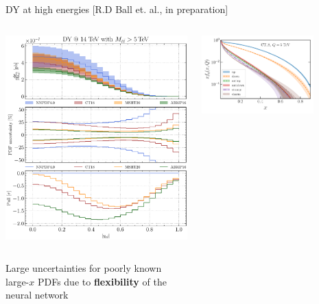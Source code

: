 \documentclass[aspectratio=169,9pt]{beamer}
\begin{document}
\begin{frame}{DY at high energies [R.D Ball et. al., in preparation]}
\begin{columns}
\begin{column}{0.66\textwidth}
\begin{column}{0.5\textwidth}
                \includegraphics[width=\textwidth]{CMS_DY_14TEV_MLL_5000_YLL}
            \end{column}
        Large uncertainties for poorly known large-$x$ PDFs due to \textbf{flexibility} of the neural network
        \end{column}
        \begin{column}{0.33\textwidth}
            \includegraphics[width=0.75\textwidth]{pdfplot-abslargex-ct18}\\

\end{column}
\end{columns}
\end{frame}
\end{document}
